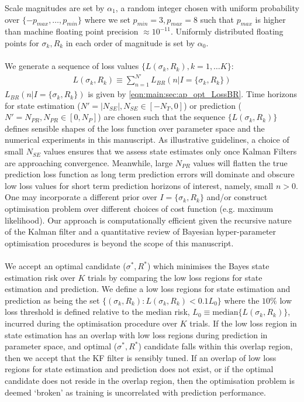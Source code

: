 Scale magnitudes are set by $\alpha_1$, a random integer chosen with uniform probability over $\{ -p_{max}, \hdots, p_{min} \}$ where we set $p_{min} = 3, p_{max} = 8$  such that $p_{max}$ is higher than machine floating point precision $\approx 10^{-11}$. Uniformly distributed floating points for $\sigma_k, R_k $ in each order of magnitude is set by $\alpha_0$. 
\\
\\
We generate a sequence of loss values $\{L(\sigma_k, R_k), k = 1, \hdots K\}$:
\begin{align}
L(\sigma_k, R_k) \equiv  \sum_{n=1}^{N'} L_{BR}(n | I= \{\sigma_k, R_k \})
\end{align}
$L_{BR}(n | I= \{\sigma_k, R_k \})$ is given by \cref{eqn:main:sec:ap_opt_LossBR}. Time horizons for state estimation ($N' = |N_{SE}| , N_{SE} \in  [-N_{T}, 0]$) or prediction ($N' = N_{PR}, N_{PR}  \in [0, N_{P}]$) are chosen such that the sequence $\{L(\sigma_k, R_k) \}$ defines sensible shapes of the loss function over parameter space and the numerical experiments in this manuscript. As illustrative guidelines, a choice of small $N_{SE}$ values ensures that we assess state estimates only once Kalman Filters are approaching convergence. Meanwhile, large $N_{PR}$ values will flatten the true prediction loss function as long term prediction errors will dominate and obscure low loss values for short term prediction horizons of interest, namely, small $n>0$. One may incorporate a different prior over $I= \{\sigma_k, R_k \}$ and/or construct optimisation problem over different choices of cost function (e.g. maximum likelihood). Our approach is computationally efficient given the recursive nature of the Kalman filter and a quantitative review of Bayesian hyper-parameter optimisation procedures is beyond the scope of this manuscript. 
\\
\\
We accept an optimal candidate ($\sigma^*, R^*$) which minimises the Bayes state estimation risk over $K$ trials by comparing the low loss regions for state estimation and prediction. We define a low loss regions for state estimation and prediction as being the set $ \{ (\sigma_k, R_k) : L(\sigma_k, R_k) < 0.1 L_0 \}$ where the $10 \%$ low loss threshold is defined relative to the median risk, $L_0 \equiv \text{median}\{  L(\sigma_k, R_k) \}$, incurred during the optimisation procedure over $K$ trials. If the low loss region in state estimation has an overlap with low loss regions during prediction in parameter space, and optimal ($\sigma^*, R^*$) candidate falls within this overlap region, then we accept that the KF filter is sensibly tuned. If an overlap of low loss regions for state estimation and prediction does not exist, or if the optimal candidate does not reside in the overlap region, then the optimisation problem is deemed `broken' as training is uncorrelated with prediction performance. 
